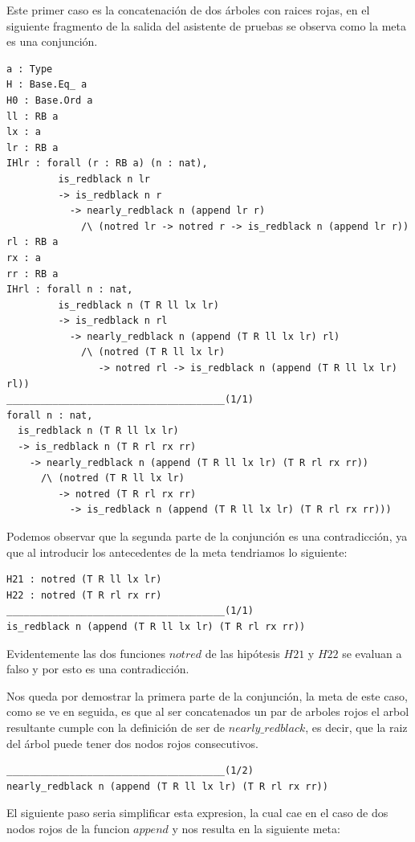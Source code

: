 \documentclass[8pt,leqno,pdflatex,spanish]{book}
\theoremstyle{plain}
\theoremstyle{definition}
\theoremstyle{remark}
\begin{document}
Este primer caso es la concatenaci\'on de dos \'arboles con raices rojas, en el siguiente 
fragmento de la salida del asistente de pruebas se observa como la meta es una conjunci\'on.

\begin{verbatim}
a : Type
H : Base.Eq_ a
H0 : Base.Ord a
ll : RB a
lx : a
lr : RB a
IHlr : forall (r : RB a) (n : nat),
         is_redblack n lr
         -> is_redblack n r
           -> nearly_redblack n (append lr r)
             /\ (notred lr -> notred r -> is_redblack n (append lr r))
rl : RB a
rx : a
rr : RB a
IHrl : forall n : nat,
         is_redblack n (T R ll lx lr)
         -> is_redblack n rl
           -> nearly_redblack n (append (T R ll lx lr) rl)
             /\ (notred (T R ll lx lr)
                -> notred rl -> is_redblack n (append (T R ll lx lr) rl))
______________________________________(1/1)
forall n : nat,
  is_redblack n (T R ll lx lr)
  -> is_redblack n (T R rl rx rr)
    -> nearly_redblack n (append (T R ll lx lr) (T R rl rx rr))
      /\ (notred (T R ll lx lr)
         -> notred (T R rl rx rr)
           -> is_redblack n (append (T R ll lx lr) (T R rl rx rr)))
\end{verbatim}

Podemos observar que la segunda parte de la conjunci\'on es una contradicci\'on, ya que al 
introducir los antecedentes de la meta tendriamos lo siguiente:

\begin{verbatim}
H21 : notred (T R ll lx lr)
H22 : notred (T R rl rx rr)
______________________________________(1/1)
is_redblack n (append (T R ll lx lr) (T R rl rx rr))
\end{verbatim}

Evidentemente las dos funciones $notred$ de las hip\'otesis $H21$ y $H22$ se evaluan a falso y por 
esto es una contradicci\'on.

Nos queda por demostrar la primera parte de la conjunci\'on, la meta de este caso, como se ve en 
seguida, es que al ser concatenados un par de arboles rojos el arbol resultante cumple con la 
definici\'on de ser de $nearly\_redblack$, es decir, que la raiz del \'arbol puede tener dos nodos 
rojos consecutivos.

\begin{verbatim}
______________________________________(1/2)
nearly_redblack n (append (T R ll lx lr) (T R rl rx rr))
\end{verbatim}

El siguiente paso seria simplificar esta expresion, la cual cae en el caso de dos nodos rojos de la funcion $append$ y nos resulta en la siguiente meta:
\end{document}
